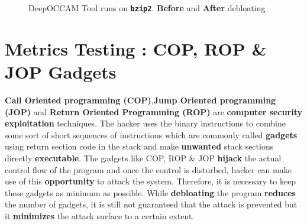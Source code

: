 \documentclass{article} %
\begin{document}
\begin{figure}%
	\centering
	\qquad
	\caption{DeepOCCAM Tool runs on \textbf{\texttt{bzip2}}. \textbf{\color{red} Before} and \textbf{\color{ao(english)} After} debloating}%
	\label{fig:example}%
\end{figure}

\section*{\color{darkmidnightblue} Metrics Testing : COP, ROP \& JOP Gadgets} 
\textbf{Call Oriented programming (COP)},\textbf{Jump Oriented programming (JOP)} and \textbf{Return Oriented Programming (ROP)} are \textbf{computer security exploitation} techniques. The hacker uses the binary instructions to combine some sort of short sequences of instructions which are commonly called \textbf{gadgets} using return section code in the stack and make \textbf{unwanted} stack sections directly \textbf{executable}. The gadgets like COP, ROP \& JOP \textbf{hijack} the actual control flow of the program and once the control is disturbed, hacker can make use of this \textbf{opportunity} to attack the system. Therefore, it is necessary to keep these gadgets as minimum as possible. While \textbf{debloating} the program \textbf{reduces} the number of gadgets, it is still not guaranteed that the attack is prevented but it \textbf{minimizes} the attack surface to a certain extent.
\end{document}
